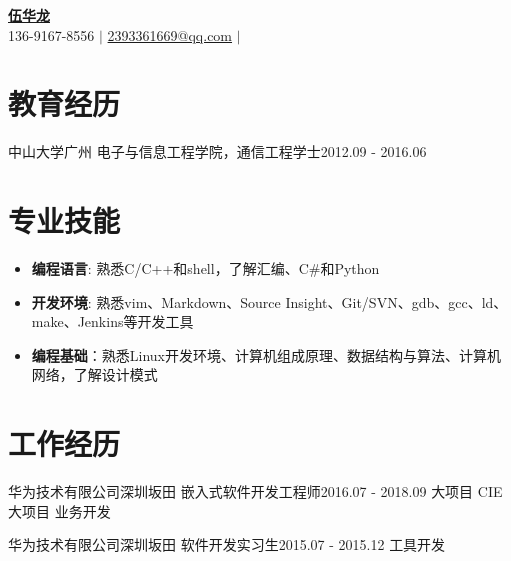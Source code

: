 



\begin{center}
  \small \textbf{\href{http://www.cnblogs.com/wuhualong/}{\huge 伍华龙}} \\  
  136-9167-8556 $\vert$
  \href{mailto:2393361669@qq.com}{2393361669@qq.com} $\vert$
  \href{https://github.com/whl1729}{\color{blue}{https://github.com/whl1729}} \\
\end{center}

\section{教育经历}
  \resumeSubHeadingListStart
    \resumeSubheading
      {中山大学}{广州}
      {电子与信息工程学院，通信工程学士}{2012.09 - 2016.06}
  \resumeSubHeadingListEnd

\section{专业技能}
  \begin{itemize}[leftmargin=*]
    \item \textbf{编程语言}: 熟悉C/C++和shell，了解汇编、C\#和Python
    \item \textbf{开发环境}: 熟悉vim、Markdown、Source Insight、Git/SVN、gdb、gcc、ld、make、Jenkins等开发工具
    \item \textbf{编程基础}：熟悉Linux开发环境、计算机组成原理、数据结构与算法、计算机网络，了解设计模式
  \end{itemize}

\section{工作经历}
  \resumeSubHeadingListStart

    \resumeSubheading
      {华为技术有限公司}{深圳坂田}
      {嵌入式软件开发工程师}{2016.07 - 2018.09}
      \resumeItemListStart
          {大项目}
          {CIE}
          {大项目}
          {业务开发}
      \resumeItemListEnd

    \resumeSubheading
      {华为技术有限公司}{深圳坂田}
      {软件开发实习生}{2015.07 - 2015.12}
      \resumeItemListStart
          {工具开发}
      \resumeItemListEnd

